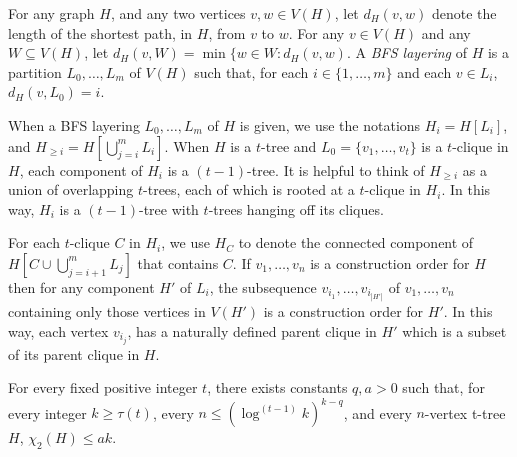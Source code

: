 \documentclass[kpfonts]{patmorin}
\newcommand{\uqs}{\chi_2}
\theoremstyle{named}
\begin{document}
For any graph $H$, and any two vertices $v,w\in V(H)$, let $d_H(v,w)$ denote the length of the shortest path, in $H$, from $v$ to $w$. For any $v\in V(H)$ and any $W\subseteq V(H)$, let $d_H(v,W)=\min\{w\in W: d_H(v,w)$. A \emph{BFS layering} of $H$ is a partition $L_0,\ldots,L_m$ of $V(H)$ such that, for each $i\in\{1,\ldots,m\}$ and each $v\in L_i$, $d_H(v,L_0)=i$.

When a BFS layering $L_0,\ldots,L_m$ of $H$ is given, we use the notations $H_i=H[L_i]$, and $H_{\ge i}=H[\bigcup_{j=i}^m L_i]$.  When $H$ is a $t$-tree and $L_0=\{v_1,\ldots,v_t\}$ is a $t$-clique in $H$, each component of $H_i$ is a $(t-1)$-tree.  It is helpful to think of $H_{\ge i}$ as a union of overlapping $t$-trees, each of which is rooted at a $t$-clique in $H_i$. In this way, $H_i$ is a $(t-1)$-tree with $t$-trees hanging off its cliques.

For each $t$-clique $C$ in $H_i$, we use $H_C$ to denote the connected component of $H[C\cup\bigcup_{j=i+1}^m L_j]$ that contains $C$.  If $v_1,\ldots,v_n$ is a construction order for $H$ then for any component $H'$ of $L_i$, the subsequence $v_{i_1},\ldots,v_{i_{|H'|}}$ of $v_1,\ldots,v_n$ containing only those vertices in $V(H')$ is a construction order for $H'$.  In this way, each vertex $v_{i_j}$, has a naturally defined parent clique in $H'$ which is a subset of its parent clique in $H$.




\begin{thm}\label{two-tree-technical}
    For every fixed positive integer $t$, there exists constants $q,a>0$ such that, for every integer $k\ge \tau(t)$, every $n\le (\log^{(t-1)} k)^{k-q}$, and every $n$-vertex t-tree $H$, $\uqs(H)\le ak$.
\end{thm}
\end{document}
